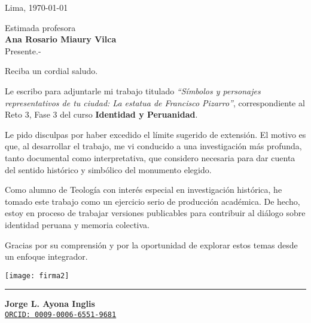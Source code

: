 \documentclass{letter}
\begin{document}
	
	\begin{flushright}
		Lima, \today
	\end{flushright}
	
	\vspace{0.5cm}
	
	Estimada profesora\\
	\textbf{Ana Rosario Miaury Vilca}\\
	Presente.-
	
	\vspace{0.5cm}
	
	Reciba un cordial saludo.
	
	Le escribo para adjuntarle mi trabajo titulado \textit{“Símbolos y personajes representativos de tu ciudad: La estatua de Francisco Pizarro”}, correspondiente al Reto 3, Fase 3 del curso \textbf{Identidad y Peruanidad}.
	
	Le pido disculpas por haber excedido el límite sugerido de extensión. El motivo es que, al desarrollar el trabajo, me vi conducido a una investigación más profunda, tanto documental como interpretativa, que considero necesaria para dar cuenta del sentido histórico y simbólico del monumento elegido.
	
	Como alumno de Teología con interés especial en investigación histórica, he tomado este trabajo como un ejercicio serio de producción académica. De hecho, estoy en proceso de trabajar versiones publicables para contribuir al diálogo sobre identidad peruana y memoria colectiva.
	
	Gracias por su comprensión y por la oportunidad de explorar estos temas desde un enfoque integrador.
	
	\vspace{1cm}
	
	\texttt{[image: firma2]} %
	
	\vspace{0.1cm}
	\rule{5cm}{0.4pt} %
	
	\noindent\textbf{Jorge L. Ayona Inglis} \\
	\href{https://orcid.org/0009-0006-6551-9681}{\texttt{ORCID: 0009-0006-6551-9681}}
	
\end{document}
